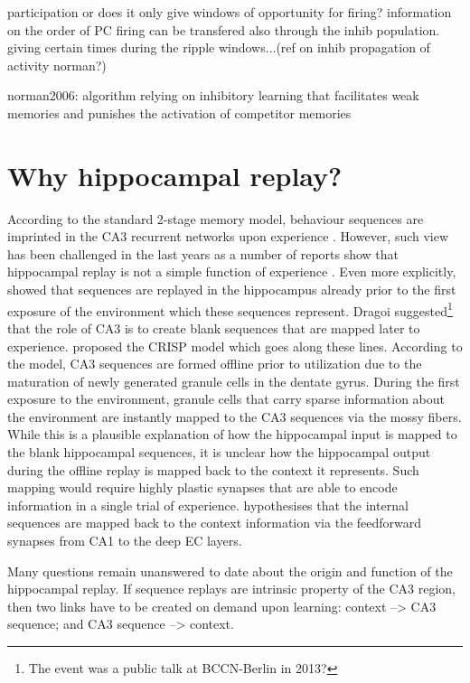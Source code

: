   participation or does it only give windows of opportunity for firing?
  information on the order of PC firing can be transfered also through the inhib population.
  giving certain times during the ripple windows...(ref on inhib propagation of activity norman?)

  norman2006: algorithm relying on inhibitory learning that facilitates weak memories
  and punishes the activation of competitor memories

\section{Why hippocampal replay?}
  According to the standard 2-stage memory model, behaviour sequences are
  imprinted in the CA3 recurrent networks upon experience \citep{Marr1971,
  Buzsaki1989}. However, such view has been challenged in the last years as a
  number of reports show that hippocampal replay is not a simple function of
  experience \citep[e.g.,][]{Gupta2010}. Even more explicitly,
  \cite{Dragoi2011, Dragoi2013} showed that sequences are replayed in the
  hippocampus already prior to the first exposure of the environment which
  these sequences represent. Dragoi suggested\footnote{The event was a public
  talk at BCCN-Berlin in 2013?} that the role of CA3 is to create blank
  sequences that are mapped later to experience. \cite{ChengS2013} proposed the
  CRISP model which goes along these lines. According to the model, CA3
  sequences are formed offline prior to utilization due to the maturation of
  newly generated granule cells in the dentate gyrus. During the first exposure
  to the environment, granule cells that carry sparse information about the
  environment are instantly mapped to the CA3 sequences via the mossy fibers.
  While this is a plausible explanation of how the hippocampal input is mapped
  to the blank hippocampal sequences, it is unclear how the hippocampal output
  during the offline replay is mapped back to the context it represents. Such
  mapping would require highly plastic synapses that are able to encode
  information in a single trial of experience. \cite{ChengS2013} hypothesises
  that the internal sequences are mapped back to the context information via
  the feedforward synapses from CA1 to the deep EC layers.

  Many questions remain unanswered to date about the origin and function of the
  hippocampal replay. If sequence replays are intrinsic property of the CA3
  region, then two links have to be created on demand upon learning: context
  --> CA3 sequence; and CA3 sequence --> context.  

